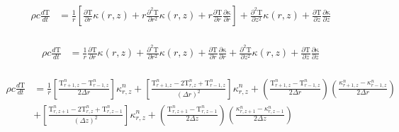\documentclass[12pt]{article}
\begin{document}
\begin{equation}
  \begin{aligned}
    \rho c \frac{d\mathrm{T}}{dt} &= \frac{1}{r} \left [ \frac{\partial\mathrm{T}}{\partial r}\kappa(r, z) + r\frac{\partial^2\mathrm{T}}{\partial r^2}\kappa(r, z)  + r\frac{\partial\mathrm{T}}{\partial r} \frac{\partial\mathrm{\kappa}}{\partial r} \right ] + \frac{\partial^2\mathrm{T}}{\partial z^2}\kappa(r, z) + \frac{\partial\mathrm{T}}{\partial z}\frac{\partial\mathrm{\kappa}}{\partial z} \\
  \end{aligned}
\end{equation}

\begin{equation}
  \begin{aligned}
    \rho c \frac{d\mathrm{T}}{dt} &= \frac{1}{r} \frac{\partial\mathrm{T}}{\partial r}\kappa(r, z) + \frac{\partial^2\mathrm{T}}{\partial r^2}\kappa(r, z)  + \frac{\partial\mathrm{T}}{\partial r} \frac{\partial\mathrm{\kappa}}{\partial r}  + \frac{\partial^2\mathrm{T}}{\partial z^2}\kappa(r, z) + \frac{\partial\mathrm{T}}{\partial z}\frac{\partial\mathrm{\kappa}}{\partial z} \\
  \end{aligned}
\end{equation}

\begin{equation}
  \begin{aligned}
    \rho c \frac{d\mathrm{T}}{dt} &= \frac{1}{r} \left [\frac{\mathrm{T}^{n}_{r + 1, z} - \mathrm{T}^{n}_{r - 1, z}}{2\Delta r}  \right ]\kappa^{n}_{r, z} + \left [\frac{\mathrm{T}^{n}_{r + 1, z}  - 2 \mathrm{T}^{n}_{r, z} +  \mathrm{T}^{n}_{r - 1, z}}{(\Delta r)^2} \right ]  \kappa^{n}_{r, z} + (\frac{\mathrm{T}^{n}_{r + 1, z} - \mathrm{T}^{n}_{r - 1, z}}{2\Delta r}) (\frac{\kappa^{n}_{r + 1, z} - \kappa^{n}_{r - 1, z}}{2\Delta r}) \\
    &+ \left [\frac{\mathrm{T}^{n}_{r, z + 1}  - 2 \mathrm{T}^{n}_{r, z} +  \mathrm{T}^{n}_{r, z -1}}{(\Delta z)^2} \right ]\kappa^n_{r, z} + (\frac{\mathrm{T}^{n}_{r, z + 1} - \mathrm{T}^{n}_{r, z - 1}}{2\Delta z})(\frac{\kappa^{n}_{r, z + 1} - \kappa^{n}_{r,z - 1}}{2\Delta z}) \\
  \end{aligned}
\end{equation}
\end{document}
